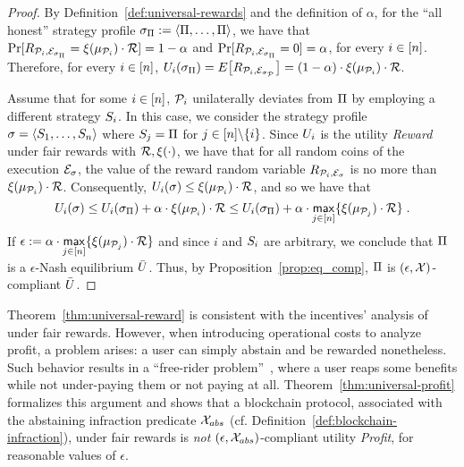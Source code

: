\begin{proof}
    By Definition~\ref{def:universal-rewards} and the definition of $\alpha$, for the ``all honest'' strategy profile $\sigma_\Pi := \langle \Pi, \ldots, \Pi \rangle$, we have that $\Pr[R_{\mathcal{P}_i,\mathcal{E}_{\sigma_\Pi}} = \xi(\mu_{\mathcal{P}_i}) \cdot \mathcal{R}] = 1 - \alpha$ and $\Pr[R_{\mathcal{P}_i, \mathcal{E}_{\sigma_\Pi}} = 0] = \alpha$, for every $i \in [n]$. Therefore, for every $i \in [n]$,
%
    $U_i(\sigma_\Pi) = E\big[R_{\mathcal{P}_i,\mathcal{E}_{\sigma_{\mathcal{P}}}}\big] = (1 - \alpha) \cdot \xi(\mu_{\mathcal{P}_i}) \cdot \mathcal{R}$.

    Assume that for some $i \in [n]$, $\mathcal{P}_i$ unilaterally deviates
    from $\Pi$ by employing a different strategy $S_i$. In this case, we
    consider the strategy profile $\sigma = \langle S_1, \ldots, S_n \rangle$
    where $S_j = \Pi$ for $j \in [n] \backslash \{i\}$. Since $U_i$ is the utility
    \emph{Reward} under fair rewards with $\mathcal{R}, \xi(\cdot)$, we have that for all random coins of the execution $\mathcal{E}_{\sigma}$, the value of the reward random variable $R_{\mathcal{P}_i, \mathcal{E}_{\sigma}}$ is no more than $\xi(\mu_{\mathcal{P}_i}) \cdot \mathcal{R}$.
    Consequently, $U_i(\sigma) \leq \xi(\mu_{\mathcal{P}_i}) \cdot \mathcal{R}$, and so we have that
    \[U_i(\sigma) \leq U_i(\sigma_\Pi) + \alpha \cdot \xi(\mu_{\mathcal{P}_i}) \cdot \mathcal{R} \leq U_i(\sigma_\Pi) + \alpha \cdot \underset{j \in [n]}{\mathsf{max}}\{\xi(\mu_{\mathcal{P}_j}) \cdot \mathcal{R} \}\;.\]
    If $\epsilon := \alpha \cdot \underset{j \in [n]}{\mathsf{max}}\{\xi(\mu_{\mathcal{P}_j}) \cdot \mathcal{R} \}$ and since $i$ and $S_i$ are arbitrary, we conclude that $\Pi$ is a $\epsilon$-Nash equilibrium
    \wrt $\bar{U}$. Thus, by Proposition~\ref{prop:eq_comp}, $\Pi$ is
    $(\epsilon, \mathcal{X})$-compliant \wrt $\bar{U}$.
\end{proof}

Theorem~\ref{thm:universal-reward} is consistent with the incentives' analysis
of~\cite{C:KRDO17} under fair rewards. However, when
introducing operational costs to analyze profit, a problem arises: a user can
simply abstain and be rewarded nonetheless. Such behavior results in a
``free-rider problem''~\cite{baumol2004welfare}, where a user reaps some
benefits while not under-paying them or not paying at all.
Theorem~\ref{thm:universal-profit} formalizes this argument and
shows that a blockchain protocol, associated with the abstaining infraction predicate $\mathcal{X}_{abs}$ (cf. Definition~\ref{def:blockchain-infraction}), under fair rewards is \emph{not}
$(\epsilon, \mathcal{X}_{abs})$-compliant \wrt utility \emph{Profit}, for reasonable values of $\epsilon$.

